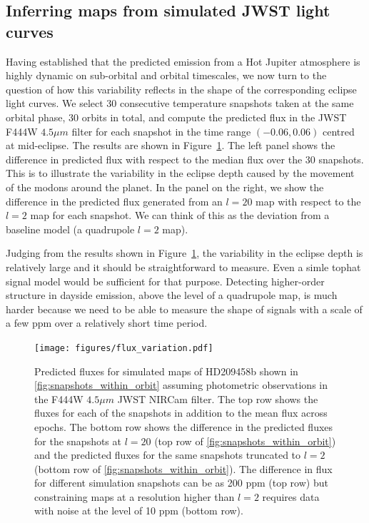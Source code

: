 \documentclass[12pt,dvipsnames]{report}
\begin{document}
\subsection{Inferring maps from simulated JWST light curves}

Having established that the predicted emission from a Hot Jupiter atmosphere is highly 
dynamic on sub-orbital and orbital timescales, we now turn to the question of how this variability
reflects in the shape of the corresponding eclipse light curves. 
We select 30 consecutive temperature  snapshots taken at the same orbital phase, 30 orbits in 
total, and compute the predicted 
flux in the JWST F444W $4.5\mu m$ filter for each snapshot in the time range 
$(-0.06,0.06)$ centred at mid-eclipse. The results are shown in 
Figure~\ref{fig:flux_variation}. The left panel shows the difference
in predicted flux with respect to the median flux over the 30 snapshots. This is to 
illustrate the variability in the eclipse depth caused by the movement of the modons 
around the planet. In the panel on the right, we show the difference in the predicted 
flux generated from an $l=20$ map with respect to the $l=2$ map for each snapshot.
We can think of this as the deviation from a baseline model (a quadrupole $l=2$ map).

Judging from the results shown in Figure~\ref{fig:flux_variation}, the variability in 
the eclipse depth is relatively large and it should be straightforward to measure.
Even a simle tophat signal model would be sufficient for that purpose.
Detecting higher-order structure in dayside emission, above the level of a 
quadrupole map, is much harder because we need to be able to measure the shape of signals 
with a scale of a few ppm over a relatively short time period. 

\begin{figure}[t!]
    \begin{centering}
        \texttt{[image: figures/flux\_variation.pdf]}
        \caption{
            Predicted fluxes for simulated maps of HD209458b shown in \ref{fig:snapshots_within_orbit} assuming photometric observations
            in the F444W $4.5\mu m$ JWST NIRCam filter.
            The top row shows the fluxes for each of the snapshots in addition to the mean flux across epochs.
            The bottom row shows the difference in the predicted fluxes for the snapshots at $l=20$ (top row of
            \ref{fig:snapshots_within_orbit}) and the predicted fluxes for the same snapshots truncated to $l=2$ (bottom row of
            \ref{fig:snapshots_within_orbit}).
            The difference in flux for different simulation snapshots can be as 200 ppm (top row) but constraining maps
            at a resolution higher than $l=2$ requires data with noise at the level of 10 ppm (bottom row).
        }
        \label{fig:flux_variation}
    \end{centering}
\end{figure}
\end{document}
